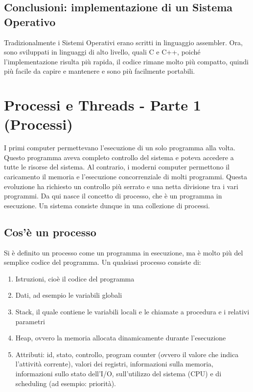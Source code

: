 \documentclass[a4paper]{article}
\begin{document}
\subsection{Conclusioni: implementazione di un Sistema Operativo}
Tradizionalmente i Sistemi Operativi erano scritti in linguaggio assembler. Ora, sono sviluppati in linguaggi di alto livello, quali C e C++, poiché l'implementazione risulta più rapida, il codice rimane molto più compatto, quindi più facile da capire e mantenere e sono più facilmente portabili.


\section{Processi e Threads - Parte 1 (Processi)}

I primi computer permettevano l'esecuzione di un solo programma alla volta. Questo programma aveva completo controllo del sistema e poteva accedere a tutte le risorse del sistema. Al contrario, i moderni computer permettono il caricamento il memoria e l'esecuzione concorrenziale di molti programmi. Questa evoluzione ha richiesto un controllo più serrato e una netta divisione tra i vari programmi. Da qui nasce il concetto di processo, che è un programma in esecuzione. Un sistema consiste dunque in una collezione di processi.

\subsection{Cos'è un processo}
Si è definito un processo come un programma in esecuzione, ma è molto più del semplice codice del programma. Un qualsiasi processo consiste di:
\begin{enumerate}
    \item Istruzioni, cioè il codice del programma
    \item Dati, ad esempio le variabili globali
    \item Stack, il quale contiene le variabili locali e le chiamate a procedura e i relativi parametri
    \item Heap, ovvero la memoria allocata dinamicamente durante l'esecuzione
    \item Attributi: id, stato, controllo, program counter (ovvero il valore che indica l'attività corrente), valori dei registri, informazioni sulla memoria, informazioni sullo stato dell'I/O, sull'utilizzo del sistema (CPU) e di scheduling (ad esempio: priorità).
\end{enumerate}
\end{document}
